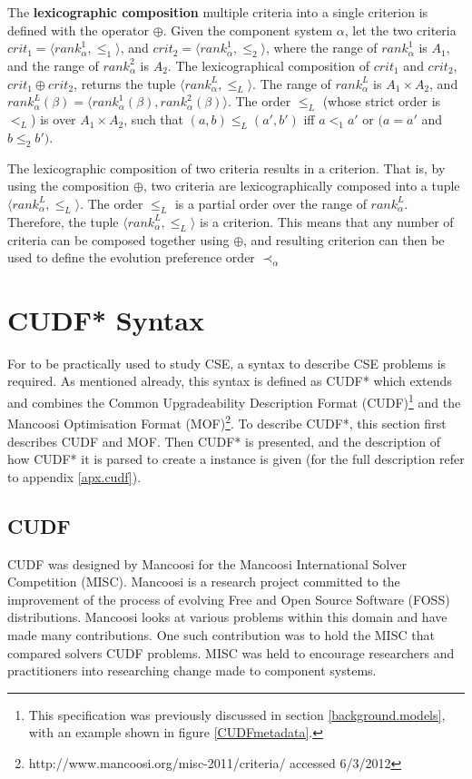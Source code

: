 \begin{defs}
\label{formal.defcritlex}
The \textbf{lexicographic composition} multiple criteria into a single criterion is defined with the operator $\oplus$.
Given the component system $\alpha$, let the two criteria $crit_1 = \langle rank^1_{\alpha}, \leq_{1} \rangle$, and $crit_2 = \langle rank^1_{\alpha}, \leq_{2} \rangle$,
where the range of $rank^1_{\alpha}$ is $A_1$, and the range of $rank^2_{\alpha}$ is $A_2$.
The lexicographical composition of $crit_1$ and $crit_2$, $crit_1 \oplus crit_2$, returns the tuple $\langle rank^L_{\alpha},\leq_L \rangle$.
The range of $rank^L_{\alpha}$ is $A_1 \times A_2$, and $rank^L_{\alpha}(\beta) = \langle rank^1_{\alpha}(\beta),rank^2_{\alpha}(\beta) \rangle$.
The order $\leq_L$ (whose strict order is $<_L$) is over $A_1 \times A_2$, such that $(a,b) \leq_L (a',b')$ iff $a <_1 a'$ or $(a = a'$ and $b \leq_2 b')$.
\end{defs}

The lexicographic composition of two criteria results in a criterion.
That is, by using the composition $\oplus$, two criteria are lexicographically composed into a tuple $\langle rank^L_{\alpha},\leq_L \rangle$.
The order $\leq_L$ is a partial order over the range of $rank^L_{\alpha}$.
Therefore, the tuple  $\langle rank^L_{\alpha},\leq_L \rangle$ is a criterion.
This means that any number of criteria can be composed together using $\oplus$,
and resulting criterion can then be used to define the evolution preference order $\prec_{\alpha}$


\section{CUDF* Syntax}
\label{formal.cudf}
For \modelname to be practically used to study CSE, a syntax to describe CSE problems is required.
As mentioned already, this syntax is defined as CUDF* which extends and combines the Common Upgradeability Description Format (CUDF)\footnote{This specification was previously discussed in section \ref{background.models}, with an example shown in figure \ref{CUDFmetadata}.
}
\citep{treinen2009common} and the Mancoosi Optimisation Format (MOF)\footnote{http://www.mancoosi.org/misc-2011/criteria/ accessed 6/3/2012}.
To describe CUDF*, this section first describes CUDF and MOF.
Then CUDF* is presented, and the description of how CUDF* it is parsed to create a \modelname instance is given (for the full description refer to appendix \ref{apx.cudf}).

\subsection{CUDF}
\label{formal.cudfDesign}
CUDF was designed by Mancoosi for the Mancoosi International Solver Competition (MISC).
Mancoosi is a research project committed to the improvement of the process of evolving Free and Open Source Software (FOSS) distributions.
Mancoosi looks at various problems within this domain and have made many contributions.
One such contribution was to hold the MISC that compared solvers CUDF problems.
MISC was held to encourage researchers and practitioners into researching change made to component systems.

